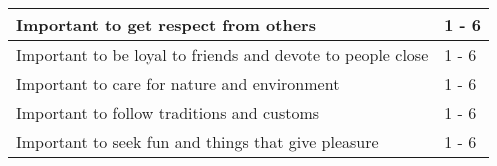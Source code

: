 \begin{table*}[p]
\begin{tabular}{|p{11.0cm}|p|}
        Important to get respect from others                                    & 1 - 6 \\\hline
        Important to be loyal to friends and devote to people close             & 1 - 6 \\\hline
        Important to care for nature and environment                            & 1 - 6 \\\hline
        Important to follow traditions and customs                              & 1 - 6 \\\hline
        Important to seek fun and things that give pleasure                     & 1 - 6 \\ \hline
\end{tabular}
\end{table*}
